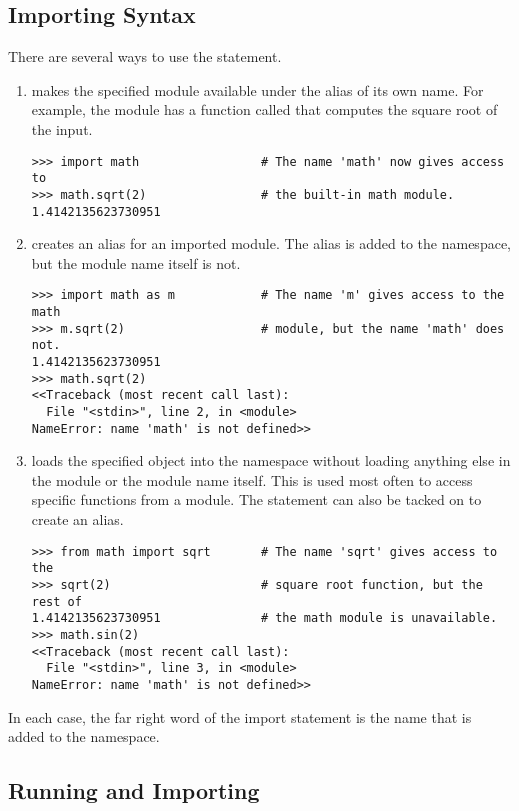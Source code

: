 \subsection*{Importing Syntax}
There are several ways to use the  statement.
\begin{enumerate}

\item {} makes the specified module available under the alias of its own name. For example, the  module has a function called  that computes the square root of the input.
\begin{lstlisting}
>>> import math                 # The name 'math' now gives access to
>>> math.sqrt(2)                # the built-in math module.
1.4142135623730951
\end{lstlisting}

\item {} creates an alias for an imported module. The alias is added to the namespace, but the module name itself is not.
\begin{lstlisting}
>>> import math as m            # The name 'm' gives access to the math
>>> m.sqrt(2)                   # module, but the name 'math' does not.
1.4142135623730951
>>> math.sqrt(2)
<<Traceback (most recent call last):
  File "<stdin>", line 2, in <module>
NameError: name 'math' is not defined>>
\end{lstlisting}

\item {} loads the specified object into the namespace without loading anything else in the module or the module name itself.
This is used most often to access specific functions from a module.
The  statement can also be tacked on to create an alias.
\begin{lstlisting}
>>> from math import sqrt       # The name 'sqrt' gives access to the
>>> sqrt(2)                     # square root function, but the rest of
1.4142135623730951              # the math module is unavailable.
>>> math.sin(2)
<<Traceback (most recent call last):
  File "<stdin>", line 3, in <module>
NameError: name 'math' is not defined>>
\end{lstlisting}
\end{enumerate}
In each case, the far right word of the import statement is the name that is added to the namespace.

\subsection*{Running and Importing}

